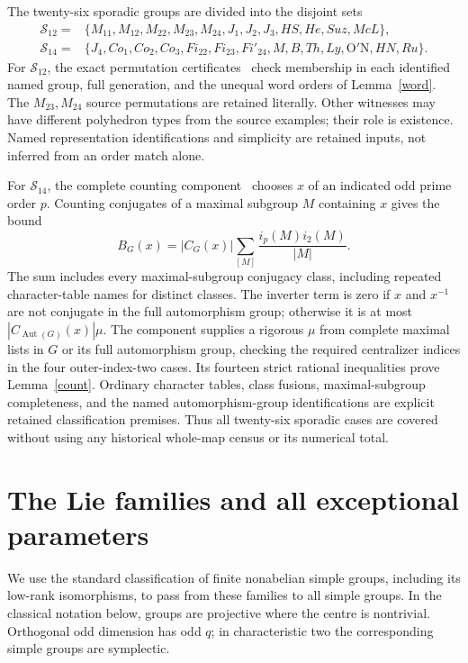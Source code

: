 \documentclass[11pt,a4paper]{article}
\newcommand{\Aut}{\operatorname{Aut}}\newcommand{\PSL}{\operatorname{PSL}}\newcommand{\PSU}{\operatorname{PSU}}\newcommand{\PSp}{\operatorname{PSp}}\newcommand{\Om}{\Omega}\newcommand{\Sp}{\operatorname{Sp}}
\newcommand{\ii}{i_2}\newcommand{\nuu}{\nu_2}
\begin{document}
The twenty-six sporadic groups are divided into the disjoint sets
\[
\begin{split}
\mathcal S_{12}={}&\{M_{11},M_{12},M_{22},M_{23},M_{24},J_1,J_2,J_3,
 HS,He,Suz,McL\},\\
\mathcal S_{14}={}&\{J_4,Co_1,Co_2,Co_3,Fi_{22},Fi_{23},Fi'_{24},
 M,B,Th,Ly,\mathrm{O'N},HN,Ru\}.
\end{split}
\]
For $\mathcal S_{12}$, the exact permutation certificates~\cite{Twelve}
check membership in each identified named group, full generation, and
the unequal word orders of Lemma~\ref{word}. The $M_{23},M_{24}$ source
permutations are retained literally. Other witnesses may have different
polyhedron types from the source examples; their role is existence.
Named representation identifications and simplicity are retained inputs,
not inferred from an order match alone.

For $\mathcal S_{14}$, the complete counting component~\cite{Sporadic}
chooses $x$ of an indicated odd prime order $p$. Counting conjugates of a
maximal subgroup $M$ containing $x$ gives the bound
\[
 B_G(x)=|C_G(x)|\sum_{[M]}\frac{i_p(M)\ii(M)}{|M|}.
\]
The sum includes every maximal-subgroup conjugacy class, including
repeated character-table names for distinct classes. The inverter term
is zero if $x$ and $x^{-1}$ are not conjugate in the full automorphism
group; otherwise it is at most $|C_{\Aut(G)}(x)|\mu$.
The component supplies a rigorous $\mu$ from complete maximal lists in
$G$ or its full automorphism group, checking the required centralizer
indices in the four outer-index-two cases. Its fourteen strict rational
inequalities prove Lemma~\ref{count}. Ordinary character tables, class
fusions, maximal-subgroup completeness, and the named automorphism-group
identifications are explicit retained classification premises. Thus all
twenty-six sporadic cases are covered without using any historical
whole-map census or its numerical total.

\section{The Lie families and all exceptional parameters}
We use the standard classification of finite nonabelian simple groups,
including its low-rank isomorphisms, to pass from these families to all
simple groups. In the classical notation below, groups are projective
where the centre is nontrivial. Orthogonal odd dimension has odd $q$;
in characteristic two the corresponding simple groups are symplectic.
\end{document}
